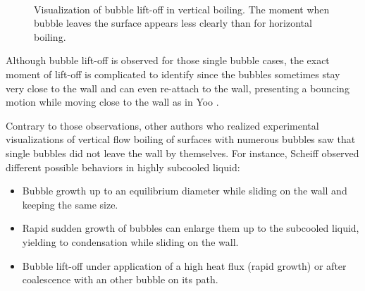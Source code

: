 \begin{figure}[h!]
\begin{center}
\\
\end{center}
\caption{Visualization of bubble lift-off in vertical boiling. The moment when bubble leaves the surface appears less clearly than for horizontal boiling.} 
\label{fig:exp_lift}
\end{figure}

\npar

Although bubble lift-off is observed for those single bubble cases, the exact moment of lift-off is complicated to identify since the bubbles sometimes stay very close to the wall and can even re-attach to the wall, presenting a bouncing motion while moving close to the wall as in Yoo \etal \cite{yoo_experimental_2016-1}.

\npar

Contrary to those observations, other authors who realized experimental visualizations of vertical flow boiling of surfaces with numerous bubbles saw that single bubbles did not leave the wall by themselves. For instance, Scheiff \cite{scheiff_etude_2018} observed different possible behaviors in highly subcooled liquid:

\begin{itemize}
\item Bubble growth up to an equilibrium diameter while sliding on the wall and keeping the same size. 
\item Rapid sudden growth of bubbles can enlarge them up to the subcooled liquid, yielding to condensation while sliding on the wall.
\item Bubble lift-off under application of a high heat flux (rapid growth) or after coalescence with an other bubble on its path.
\end{itemize}

